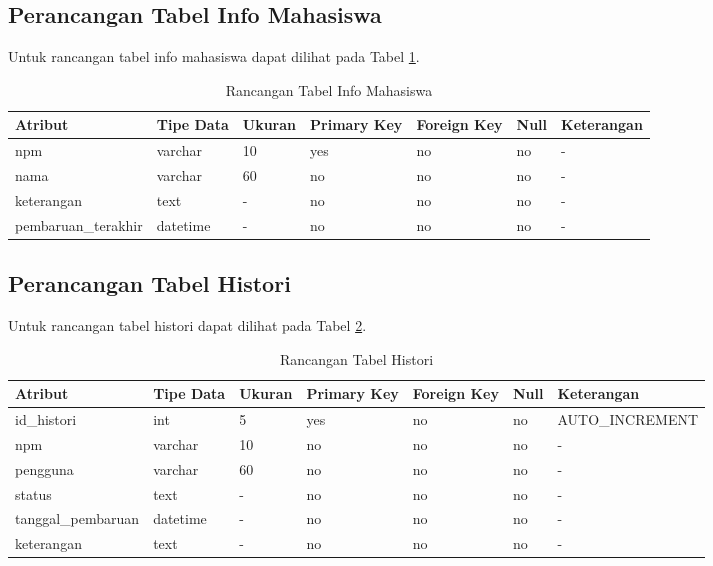 \subsection{Perancangan Tabel Info Mahasiswa}
Untuk rancangan tabel info mahasiswa dapat dilihat pada Tabel
\ref{tab:rancangantabelinfomahasiswa}.

\begin{table}[h]
\caption[Tabel 4-7 Rancangan Tabel Info Mahasiswa]{Rancangan Tabel Info Mahasiswa}
\label{tab:rancangantabelinfomahasiswa}
\begin{tabular}{|l|p{1.5cm}|p{1.2cm}|p{1.2cm}|p{1.2cm}|p{0.8cm}|l|}
\hline
Atribut & Tipe Data & Ukuran & Primary Key & Foreign Key & Null & Keterangan\\
\hline
npm & varchar & 10 & yes & no & no & -\\
\hline
nama & varchar & 60 & no & no & no & -\\
\hline
keterangan & text & - & no & no & no & -\\
\hline
pembaruan\_terakhir & datetime & - & no & no & no & -\\
\hline
\end{tabular}
\end{table}

\subsection{Perancangan Tabel Histori}
Untuk rancangan tabel histori dapat dilihat pada Tabel
\ref{tab:rancangantabelhistori}.

\begin{table}[h]
\caption[Tabel 4-8 Rancangan Tabel Histori]{Rancangan Tabel Histori}
\label{tab:rancangantabelhistori}
\begin{tabular}{|l|p{1.5cm}|p{1.2cm}|p{1.2cm}|p{1.2cm}|p{0.8cm}|l|}
\hline
Atribut & Tipe Data & Ukuran & Primary Key & Foreign Key & Null & Keterangan\\
\hline
id\_histori & int & 5 & yes & no & no & AUTO\_INCREMENT\\
\hline
npm & varchar & 10 & no & no & no & -\\
\hline
pengguna & varchar & 60 & no & no & no & -\\
\hline
status & text & - & no & no & no & -\\
\hline
tanggal\_pembaruan & datetime & - & no & no & no & -\\
\hline
keterangan & text & - & no & no & no & -\\
\hline
\end{tabular}
\end{table}

